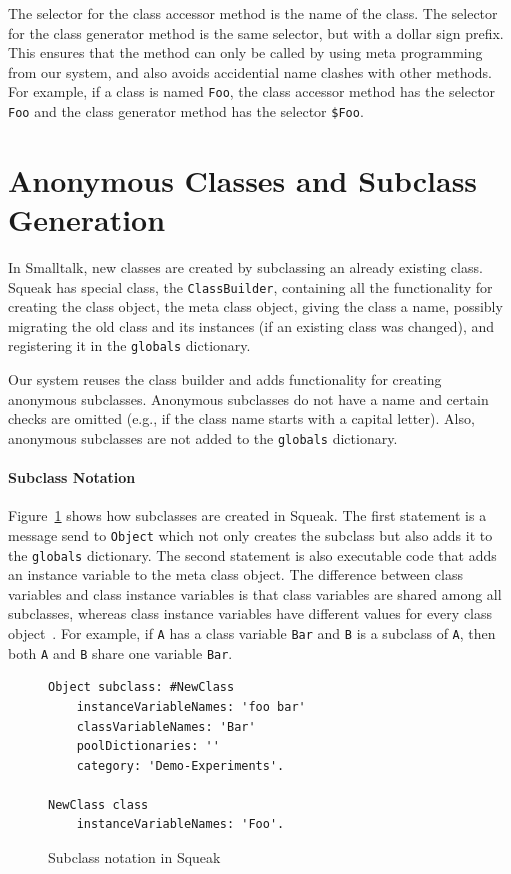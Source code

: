 The selector for the class accessor method is the name of the class. The selector for the class generator method is the same selector, but with a dollar sign prefix. This ensures that the method can only be called by using meta programming from our system, and also avoids accidential name clashes with other methods. For example, if a class is named \texttt{Foo}, the class accessor method has the selector \texttt{Foo} and the class generator method has the selector \texttt{\$Foo}.

\section{Anonymous Classes and Subclass Generation}
In Smalltalk, new classes are created by subclassing an already existing class. Squeak has special class, the \texttt{ClassBuilder}, containing all the functionality for creating the class object, the meta class object, giving the class a name, possibly migrating the old class and its instances (if an existing class was changed), and registering it in the \texttt{globals} dictionary.

Our system reuses the class builder and adds functionality for creating anonymous subclasses. Anonymous subclasses do not have a name and certain checks are omitted (e.g., if the class name starts with a capital letter). Also, anonymous subclasses are not added to the \texttt{globals} dictionary.

\paragraph{Subclass Notation}
Figure~\ref{fig:impl_subclass_squeak} shows how subclasses are created in Squeak. The first statement is a message send to \texttt{Object} which not only creates the subclass but also adds it to the \texttt{globals} dictionary. The second statement is also executable code that adds an instance variable to the meta class object. The difference between class variables and class instance variables is that class variables are shared among all subclasses, whereas class instance variables have different values for every class object~\cite{classvar1,classvar2}. For example, if \texttt{A} has a class variable \texttt{Bar} and \texttt{B} is a subclass of \texttt{A}, then both \texttt{A} and \texttt{B} share one variable \texttt{Bar}.

\begin{figure}[!htp]
\begin{lstlisting}
Object subclass: #NewClass
    instanceVariableNames: 'foo bar'
    classVariableNames: 'Bar'
    poolDictionaries: ''
    category: 'Demo-Experiments'.

NewClass class
	instanceVariableNames: 'Foo'.
\end{lstlisting}
\caption{Subclass notation in Squeak}
\label{fig:impl_subclass_squeak}
\end{figure}

